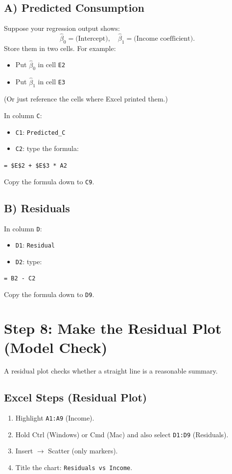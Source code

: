 \documentclass[11pt]{article}
\newcommand{\bhat}{\widehat{\beta}}
\begin{document}
\subsection*{A) Predicted Consumption}
Suppose your regression output shows:
\[
\bhat_0 = \text{(Intercept)}, \quad \bhat_1 = \text{(Income coefficient)}.
\]
Store them in two cells. For example:
\begin{itemize}
  \item Put $\bhat_0$ in cell \texttt{E2}
  \item Put $\bhat_1$ in cell \texttt{E3}
\end{itemize}
(Or just reference the cells where Excel printed them.)

In column \texttt{C}:
\begin{itemize}
  \item \texttt{C1}: \texttt{Predicted\_C}
  \item \texttt{C2}: type the formula:
\end{itemize}

\begin{tcolorbox}[colback=gray!5, colframe=black!40, title=Excel Formula: Predicted Consumption]
\texttt{= \$E\$2 + \$E\$3 * A2}
\end{tcolorbox}

Copy the formula down to \texttt{C9}.

\subsection*{B) Residuals}
In column \texttt{D}:
\begin{itemize}
  \item \texttt{D1}: \texttt{Residual}
  \item \texttt{D2}: type:
\end{itemize}

\begin{tcolorbox}[colback=gray!5, colframe=black!40, title=Excel Formula: Residual]
\texttt{= B2 - C2}
\end{tcolorbox}

Copy the formula down to \texttt{D9}.

\section*{Step 8: Make the Residual Plot (Model Check)}
A residual plot checks whether a straight line is a reasonable summary.

\subsection*{Excel Steps (Residual Plot)}
\begin{enumerate}
  \item Highlight \texttt{A1:A9} (Income).
  \item Hold Ctrl (Windows) or Cmd (Mac) and also select \texttt{D1:D9} (Residuals).
  \item Insert $\rightarrow$ Scatter (only markers).
  \item Title the chart: \texttt{Residuals vs Income}.
\end{enumerate}
\end{document}
